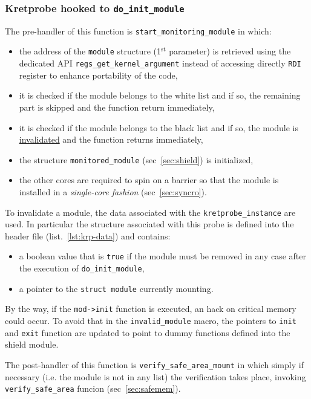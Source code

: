 \documentclass{article}
\begin{document}
	\subsubsection{Kretprobe hooked to \texttt{do\_init\_module}}
	The pre-handler of this function is \texttt{start\_monitoring\_module} in which:
	\begin{itemize}
		\item the address of the \texttt{module} structure (1$^{\text{st}}$ parameter) is retrieved using the dedicated
		API \texttt{regs\_get\_kernel\_argument} instead of accessing directly \texttt{RDI} register to enhance
		portability of the code,
		\item it is checked if the module belongs to the white list and if so, the remaining part is skipped
		and the function return immediately,
		\item it is checked if the module belongs to the black list and if so, the module is \ul{invalidated} and the
		function returns immediately,
		\item the structure \texttt{monitored\_module} (sec~\ref{sec:shield}) is initialized,
		\item the other cores are required to spin on a barrier so that the module is installed in a \textit{single-core
		fashion} (sec~\ref{sec:syncro}).
	\end{itemize}

	To invalidate a module, the data associated with the \texttt{kretprobe\_instance} are used. In particular the
	structure associated with this probe is defined into the header file (list.~\ref{lst:krp-data}) and contains:
	\begin{itemize}
		\item a boolean value that is \texttt{true} if the module must be removed in any case after the execution of
		\texttt{do\_init\_module},
		\item a pointer to the \texttt{struct module} currently mounting.
	\end{itemize}

	By the way, if the \texttt{mod->init} function is executed, an hack on critical memory could occur. To avoid
	that in the \texttt{invalid\_module} macro, the pointers to \texttt{init} and \texttt{exit} function are updated to
	point to dummy functions defined into the shield module.

	The post-handler of this function is \texttt{verify\_safe\_area\_mount} in which simply if necessary (i.e. the
	module is not in any list) the verification takes place, invoking \texttt{verify\_safe\_area} funcion
	(sec~\ref{sec:safemem}).
\end{document}
